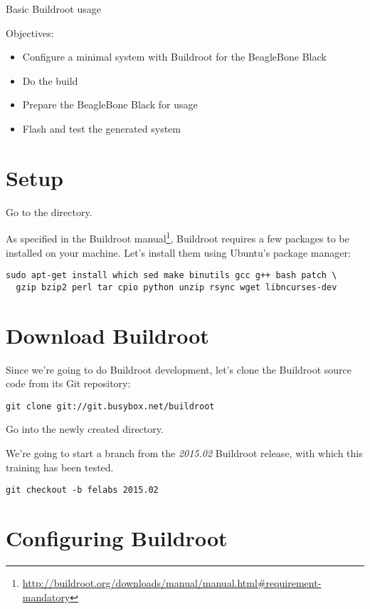 \subchapter
{Basic Buildroot usage}
{Objectives:
  \begin{itemize}
  \item Configure a minimal system with Buildroot for the BeagleBone Black
  \item Do the build
  \item Prepare the BeagleBone Black for usage
  \item Flash and test the generated system
  \end{itemize}
}

\section{Setup}

Go to the  directory.

As specified in the Buildroot
manual\footnote{\url{http://buildroot.org/downloads/manual/manual.html\#requirement-mandatory}},
Buildroot requires a few packages to be installed on your
machine. Let's install them using Ubuntu's package manager:

\begin{verbatim}
sudo apt-get install which sed make binutils gcc g++ bash patch \
  gzip bzip2 perl tar cpio python unzip rsync wget libncurses-dev
\end{verbatim}

\section{Download Buildroot}

Since we're going to do Buildroot development, let's clone the
Buildroot source code from its Git repository:

\begin{verbatim}
git clone git://git.busybox.net/buildroot
\end{verbatim}

Go into the newly created  directory.

We're going to start a branch from the {\em 2015.02} Buildroot
release, with which this training has been tested.

\begin{verbatim}
git checkout -b felabs 2015.02
\end{verbatim}

\section{Configuring Buildroot}

